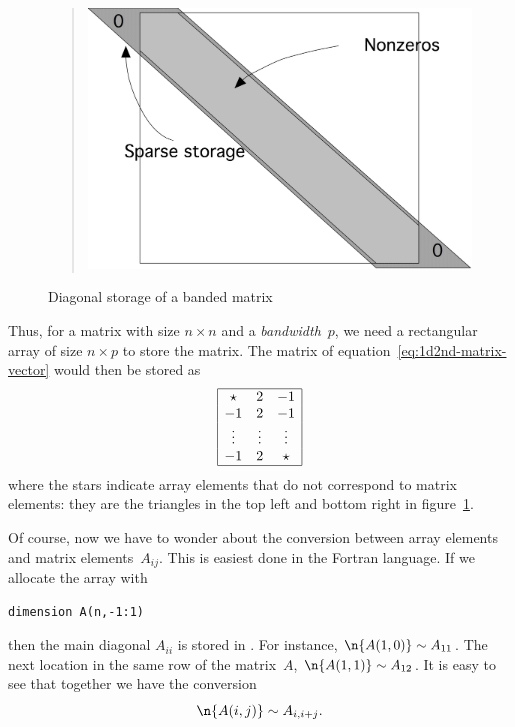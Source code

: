 \begin{figure}[ht]
  \begin{quote}
    \includegraphics[scale=.1]{graphics-public/sparsediag}
  \end{quote}
  \caption{Diagonal storage of a banded matrix}
  \label{fig:sparsediag}
\end{figure}

Thus, for a matrix with size $n\times n$ and a
\emph{bandwidth}~$p$, we need a
rectangular array of size $n\times p$ to store the matrix. The matrix
of equation~\eqref{eq:1d2nd-matrix-vector} would then be stored as
\begin{equation}
\begin{array}{|ccc|}
  \hline
  \star&2&-1\\
  -1&2&-1\\
  \vdots&\vdots&\vdots\\
  -1&2&\star\\ \hline
\end{array}
\label{eq:2minus1-by-diagonals}
\end{equation}
where the stars indicate array elements that do not correspond to
matrix elements: they are the triangles in the top left and bottom
right in figure~\ref{fig:sparsediag}. 

Of course, now we have to wonder about the conversion between array
elements  and matrix elements~$A_{ij}$. This is easiest done
in the Fortran language. If we allocate the array with
\begin{verbatim}
dimension A(n,-1:1)
\end{verbatim}
then the main diagonal $A_{ii}$ is stored in . For instance,
%
$\n{A(1,0)}\sim A_{11}$. The next location in the same row of the matrix~$A$, 
%
$\n{A(1,1)}\sim A_{12}$. It is easy to see that together we have the
conversion
\begin{equation}
  \n{A(i,j)}\sim A_{i,i+j}.
  \label{eq:sparse-conversion}
\end{equation}

